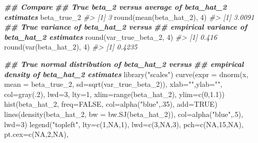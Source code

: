 \documentclass[
  14pt,
]{memoir}
\newenvironment{Shaded}{\begin{snugshade}}{\end{snugshade}}
\newcommand{\AttributeTok}[1]{\textcolor[rgb]{0.77,0.63,0.00}{#1}}
\newcommand{\CommentTok}[1]{\textcolor[rgb]{0.56,0.35,0.01}{\textit{#1}}}
\newcommand{\ConstantTok}[1]{\textcolor[rgb]{0.00,0.00,0.00}{#1}}
\newcommand{\DecValTok}[1]{\textcolor[rgb]{0.00,0.00,0.81}{#1}}
\newcommand{\DocumentationTok}[1]{\textcolor[rgb]{0.56,0.35,0.01}{\textbf{\textit{#1}}}}
\newcommand{\FloatTok}[1]{\textcolor[rgb]{0.00,0.00,0.81}{#1}}
\newcommand{\FunctionTok}[1]{\textcolor[rgb]{0.00,0.00,0.00}{#1}}
\newcommand{\NormalTok}[1]{#1}
\newcommand{\StringTok}[1]{\textcolor[rgb]{0.31,0.60,0.02}{#1}}
\begin{document}
\begin{Shaded}
\begin{Highlighting}[]
\DocumentationTok{\#\# Compare}
\DocumentationTok{\#\# True beta\_2 versus average of beta\_hat\_2 estimates}
\NormalTok{beta\_true\_2}
\CommentTok{\#\textgreater{} [1] 3}
\FunctionTok{round}\NormalTok{(}\FunctionTok{mean}\NormalTok{(beta\_hat\_2), }\DecValTok{4}\NormalTok{)}
\CommentTok{\#\textgreater{} [1] 3.0091}
\DocumentationTok{\#\# True variance of beta\_hat\_2 versus }
\DocumentationTok{\#\# empirical variance of beta\_hat\_2 estimates}
\FunctionTok{round}\NormalTok{(var\_true\_beta\_2, }\DecValTok{4}\NormalTok{)}
\CommentTok{\#\textgreater{} [1] 0.416}
\FunctionTok{round}\NormalTok{(}\FunctionTok{var}\NormalTok{(beta\_hat\_2), }\DecValTok{4}\NormalTok{)}
\CommentTok{\#\textgreater{} [1] 0.4235}

\DocumentationTok{\#\# True normal distribution of beta\_hat\_2 versus }
\DocumentationTok{\#\# empirical density of beta\_hat\_2 estimates}
\FunctionTok{library}\NormalTok{(}\StringTok{"scales"}\NormalTok{)}
\FunctionTok{curve}\NormalTok{(}\AttributeTok{expr =} \FunctionTok{dnorm}\NormalTok{(x, }\AttributeTok{mean =}\NormalTok{ beta\_true\_2, }
                   \AttributeTok{sd=}\FunctionTok{sqrt}\NormalTok{(var\_true\_beta\_2)), }
      \AttributeTok{xlab=}\StringTok{""}\NormalTok{,}\AttributeTok{ylab=}\StringTok{""}\NormalTok{, }\AttributeTok{col=}\FunctionTok{gray}\NormalTok{(.}\DecValTok{2}\NormalTok{), }\AttributeTok{lwd=}\DecValTok{3}\NormalTok{, }\AttributeTok{lty=}\DecValTok{1}\NormalTok{, }
      \AttributeTok{xlim=}\FunctionTok{range}\NormalTok{(beta\_hat\_2), }\AttributeTok{ylim=}\FunctionTok{c}\NormalTok{(}\DecValTok{0}\NormalTok{,}\FloatTok{1.1}\NormalTok{))}
\FunctionTok{hist}\NormalTok{(beta\_hat\_2, }\AttributeTok{freq=}\ConstantTok{FALSE}\NormalTok{, }\AttributeTok{col=}\FunctionTok{alpha}\NormalTok{(}\StringTok{"blue"}\NormalTok{,.}\DecValTok{35}\NormalTok{), }\AttributeTok{add=}\ConstantTok{TRUE}\NormalTok{)}
\FunctionTok{lines}\NormalTok{(}\FunctionTok{density}\NormalTok{(beta\_hat\_2, }\AttributeTok{bw =} \FunctionTok{bw.SJ}\NormalTok{(beta\_hat\_2)), }
      \AttributeTok{col=}\FunctionTok{alpha}\NormalTok{(}\StringTok{"blue"}\NormalTok{,.}\DecValTok{5}\NormalTok{), }\AttributeTok{lwd=}\DecValTok{3}\NormalTok{)}
\FunctionTok{legend}\NormalTok{(}\StringTok{"topleft"}\NormalTok{, }\AttributeTok{lty=}\FunctionTok{c}\NormalTok{(}\DecValTok{1}\NormalTok{,}\ConstantTok{NA}\NormalTok{,}\DecValTok{1}\NormalTok{), }\AttributeTok{lwd=}\FunctionTok{c}\NormalTok{(}\DecValTok{3}\NormalTok{,}\ConstantTok{NA}\NormalTok{,}\DecValTok{3}\NormalTok{), }\AttributeTok{pch=}\FunctionTok{c}\NormalTok{(}\ConstantTok{NA}\NormalTok{,}\DecValTok{15}\NormalTok{,}\ConstantTok{NA}\NormalTok{), }\AttributeTok{pt.cex=}\FunctionTok{c}\NormalTok{(}\ConstantTok{NA}\NormalTok{,}\DecValTok{2}\NormalTok{,}\ConstantTok{NA}\NormalTok{),}

\end{Highlighting}
\end{Shaded}
\end{document}
